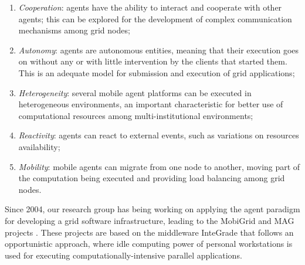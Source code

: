 \documentclass[times, 09pt, twocolumn]{article}
\begin{document}
\begin{enumerate}
    \item \emph{Cooperation}: agents have the ability to interact and cooperate
    with other agents; this can be explored for the development of complex
    communication mechanisms among grid nodes;
   
    \item \emph{Autonomy}: agents are autonomous entities, meaning that their
    execution goes on without any or with little intervention by the clients
    that started them. This is an adequate model for submission and execution
    of grid applications;
  
    \item \emph{Heterogeneity}: several mobile agent platforms can be executed
    in heterogeneous environments, an important characteristic for better use
    of computational resources among multi-institutional environments;
  
    \item \emph{Reactivity}: agents can react to external events, such as
    variations on resources availability;
  
    \item \emph{Mobility}: mobile agents can migrate from one node to another,
    moving part of the computation being executed and providing load balancing
    among grid nodes.
  
\end{enumerate}

Since 2004, our research group has being working on applying the agent paradigm
for developing a grid software infrastructure, leading to the MobiGrid and MAG
projects \cite{barbosa04,lopes05}. These projects are based on the middleware
InteGrade \cite{goldchleger04} that follows an opportunistic approach, where
idle computing power of personal workstations is used for executing
computationally-intensive parallel applications.

%
\end{document}
